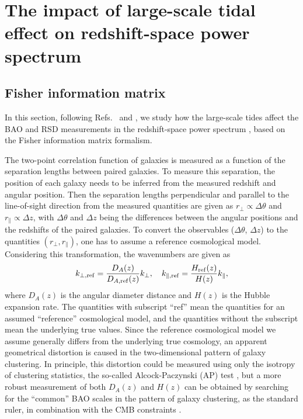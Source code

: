 \documentclass[prd,onecolumn,notitlepage,amsmath,amssymb,floatfix,superscriptaddress]{revtex4-1}
\begin{document}
\section{The impact of large-scale tidal effect on redshift-space power spectrum}
\label{sec:APtest}

\subsection{Fisher information matrix}
\label{sec:Fisher}

In this section, following Refs.~\cite{SeoEisenstein:03} and \cite{HuHaiman:03}, 
we study how the large-scale tides affect the BAO and RSD measurements 
in the redshift-space power spectrum \citep{Takadaetal:14}, based on the Fisher information matrix formalism. 

The two-point correlation function of galaxies is measured
as a function of the separation lengths between paired galaxies.
To measure this separation, the position of each galaxy needs to be inferred 
from the measured redshift and angular position.  
Then the separation lengths perpendicular and
parallel to the line-of-sight direction from the measured quantities are
given as $r_\perp\propto \Delta \theta$ and $r_\parallel\propto \Delta
z$, with $\Delta \theta $ and $ \Delta z$ being the differences between
the angular positions and the redshifts of the paired galaxies.
To convert the observables ($\Delta \theta$, $\Delta z$) to the quantities
$(r_\perp,r_\parallel)$, one has to assume a reference cosmological model.
Considering this transformation, the wavenumbers are given as
%
\begin{equation}
k_{\perp,{\rm ref}}= \frac{D_{A}(z)}{D_{A, {\rm
 ref}}(z)}
k_{\perp},
\hspace{1em}
k_{\parallel, {\rm ref}}=\frac{H_{\rm ref}(z)}{H(z)}
k_\parallel,
\end{equation}
% 
where $D_A(z)$ is the angular diameter distance and $H(z)$ is the Hubble expansion rate.
The quantities with subscript ``ref'' mean the quantities for 
 an assumed ``reference'' cosmological model, and the
quantities without the subscript mean the underlying true values. Since
the reference cosmological model we assume generally differs from the
underlying true cosmology, an apparent geometrical distortion is caused
in the two-dimensional pattern of galaxy clustering. In principle, this distortion
could be measured using only the isotropy of clustering statistics, the
so-called Alcock-Paczynski (AP) test
\cite{AlcockPaczynski:79}, but a more robust measurement of both $D_A(z)$ and
$H(z)$ can be obtained by searching for the ``common'' BAO scales in
the pattern of galaxy clustering, as the standard ruler, in combination
with the CMB constraints
\citep{SeoEisenstein:03,HuHaiman:03}.
\end{document}
